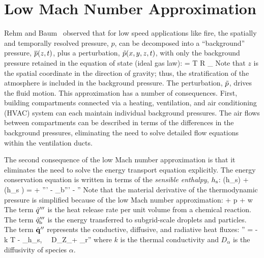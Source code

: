 \section{Low Mach Number Approximation}

Rehm and Baum~\cite{Rehm:1} observed that for low speed applications like fire, the spatially and temporally resolved pressure, $p$, can be decomposed into a ``background'' pressure, $\overline{p}(z,t)$, plus a perturbation, $\tilde{p}(x,y,z,t)$, with only the background pressure retained in the equation of state (ideal gas law):
\be \bp = \rho T {\cal R} \sum_\alpha  {} \equiv {}  \label{basicstate1} \ee
Note that $z$ is the spatial coordinate in the direction of gravity; thus, the stratification of the atmosphere is included in the background pressure. The perturbation, $\tilde{p}$, drives the fluid motion. This approximation has a number of consequences. First, building compartments connected via a heating, ventilation, and air conditioning (HVAC) system can each maintain individual background pressures. The air flows between compartments can be
described in terms of the differences in the background pressures, eliminating the need to solve detailed flow equations within the ventilation ducts.

The second consequence of the low Mach number approximation is that it eliminates the need to solve the energy transport
equation explicitly.
The energy conservation equation is written in terms of the {\em sensible enthalpy}, $h_{\rm s}$:
\be {}(\rho h_{\rm s}) + \nabla\!\cdot (\rho h_{\rm s} \bu) =  + \dq''' - \dq_{\rm b}'''
        - \nabla\!\cdot \dbq'' \label{energy} \ee
Note that the material derivative of the thermodynamic pressure is simplified because of the low Mach number approximation:
\be
    \equiv {} + \bu \cdot \nabla p \approx
    + w 
\ee
The term
$\dot{q}'''$ is the heat release rate per unit volume from a chemical reaction.
The term $\dot{q}_{\rm b}'''$ is the energy transferred to subgrid-scale droplets and particles.
The term $\dot{\bf q}''$ represents the conductive, diffusive, and radiative heat fluxes:
\be 
   \dbq'' = -k \nabla T - \sum_\alpha h_{\rm s,\alpha} \, \rho \, D_\alpha \nabla Z_\alpha + \dbq_{\rm r}'' 
\ee
where $k$ is the thermal conductivity and $D_\alpha$ is the diffusivity of species $\alpha$.

